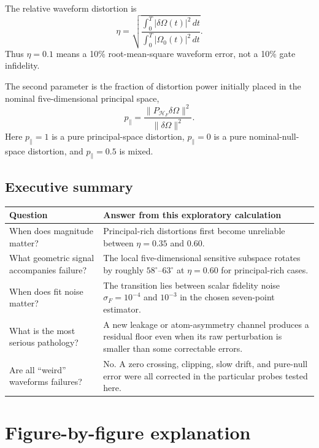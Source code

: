 \documentclass[11pt]{article}
\newcommand{\pPar}{p_{\parallel}}
\newcommand{\Om}{\Omega}
\newcommand{\dOm}{\delta\Omega}
\newcommand{\Hess}{\mathcal{H}_{F}}
\begin{document}
The relative waveform distortion is
\begin{equation}
\eta=
\sqrt{
\frac{\int_0^T|\dOm(t)|^2\,dt}
     {\int_0^T|\Om_0(t)|^2\,dt}
}.
\end{equation}
Thus $\eta=0.1$ means a 10\% root-mean-square waveform error, not a 10\%
gate infidelity.

The second parameter is the fraction of distortion power initially placed in
the nominal five-dimensional principal space,
\begin{equation}
\pPar=
\frac{\|P_{\Hess}\dOm\|^2}{\|\dOm\|^2}.
\end{equation}
Here $\pPar=1$ is a pure principal-space distortion, $\pPar=0$ is a pure
nominal-null-space distortion, and $\pPar=0.5$ is mixed.

\subsection{Executive summary}

\begin{center}
\begin{tabular}{p{}p{}}
\toprule
Question & Answer from this exploratory calculation\\
\midrule
When does magnitude matter? &
Principal-rich distortions first become unreliable between
$\eta=0.35$ and $0.60$.\\
What geometric signal accompanies failure? &
The local five-dimensional sensitive subspace rotates by roughly
$58^\circ$--$63^\circ$ at $\eta=0.60$ for principal-rich cases.\\
When does fit noise matter? &
The transition lies between scalar fidelity noise
$\sigma_F=10^{-4}$ and $10^{-3}$ in the chosen seven-point estimator.\\
What is the most serious pathology? &
A new leakage or atom-asymmetry channel produces a residual floor even when
its raw perturbation is smaller than some correctable errors.\\
Are all ``weird'' waveforms failures? &
No.  A zero crossing, clipping, slow drift, and pure-null error were all
corrected in the particular probes tested here.\\
\bottomrule
\end{tabular}
\end{center}

\section{Figure-by-figure explanation}
\end{document}
